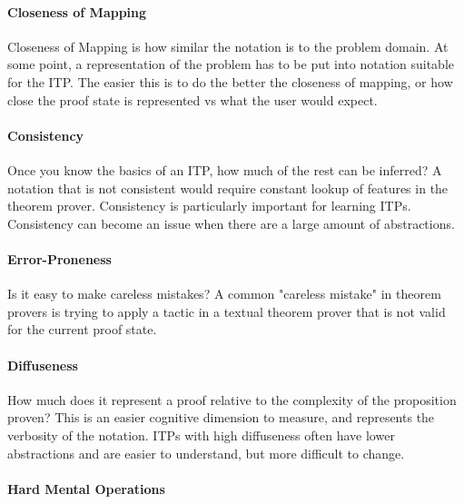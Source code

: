 \documentclass[
]{article}
\begin{document}
\hypertarget{closeness-of-mapping}{%
\paragraph{Closeness of Mapping}\label{closeness-of-mapping}}

Closeness of Mapping is how similar the notation is to the problem
domain. At some point, a representation of the problem has to be put
into notation suitable for the ITP. The easier this is to do the better
the closeness of mapping, or how close the proof state is represented vs
what the user would expect.

\hypertarget{consistency}{%
\paragraph{Consistency}\label{consistency}}

Once you know the basics of an ITP, how much of the rest can be
inferred? A notation that is not consistent would require constant
lookup of features in the theorem prover. Consistency is particularly
important for learning ITPs. Consistency can become an issue when there
are a large amount of abstractions.

\hypertarget{error-proneness}{%
\paragraph{Error-Proneness}\label{error-proneness}}

Is it easy to make careless mistakes? A common "careless mistake" in
theorem provers is trying to apply a tactic in a textual theorem prover
that is not valid for the current proof state.

\hypertarget{diffuseness}{%
\paragraph{Diffuseness}\label{diffuseness}}

How much does it represent a proof relative to the complexity of the
proposition proven? This is an easier cognitive dimension to measure,
and represents the verbosity of the notation. ITPs with high diffuseness
often have lower abstractions and are easier to understand, but more
difficult to change.

\hypertarget{hard-mental-operations}{%
\paragraph{Hard Mental Operations}\label{hard-mental-operations}}
\end{document}
